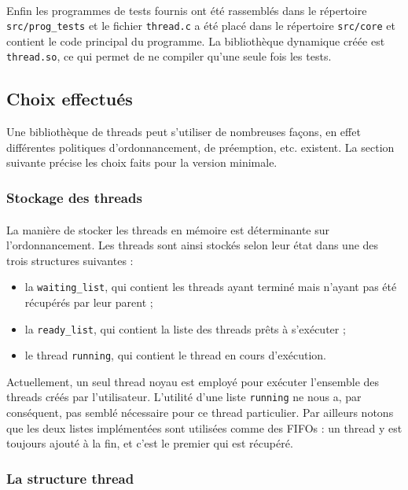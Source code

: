 \paragraph{}
Enfin les programmes de tests fournis ont été rassemblés
dans le répertoire \texttt{src/prog\_tests} et le fichier
\texttt{thread.c} a été placé dans le répertoire \texttt{src/core} et
contient le code principal du programme. La bibliothèque dynamique
créée est \texttt{thread.so}, ce qui permet de ne compiler qu'une
seule fois les tests.


\subsection{Choix effectués}

Une bibliothèque de threads peut s'utiliser de
nombreuses façons, en effet différentes politiques d'ordonnancement,
de préemption, etc. existent. La section suivante précise les choix faits 
pour la version minimale.

\subsubsection{Stockage des threads}

\paragraph{} La manière de stocker les threads en mémoire est
déterminante sur l'ordonnancement. Les threads sont ainsi stockés
selon leur état dans une des trois structures suivantes :
\begin{itemize}
\item la \texttt{waiting\_list}, qui contient les threads ayant
terminé mais n'ayant pas été récupérés par leur parent ;
\item la \texttt{ready\_list}, qui contient la liste des threads prêts
à s'exécuter ;
\item le thread \texttt{running}, qui contient le thread en cours
d'exécution.
\end{itemize} Actuellement, un seul thread noyau est employé pour
exécuter l'ensemble des threads créés par l'utilisateur. L'utilité
d'une liste \texttt{running} ne nous a, par conséquent, pas semblé
nécessaire pour ce thread particulier. Par ailleurs notons que les
deux listes implémentées sont utilisées comme des FIFOs : un thread y
est toujours ajouté à la fin, et c'est le premier qui est récupéré.

\subsubsection{La structure thread}

